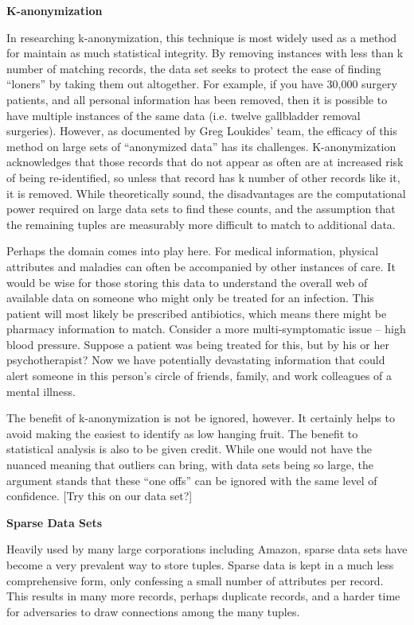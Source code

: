 \documentclass[10pt,journal,compsoc]{IEEEtran}
\begin{document}
\noindent \textbf{K-anonymization}

	In researching k-anonymization, this technique is most widely used as a method for maintain as much statistical integrity.  By removing instances with less than k number of matching records, the data set seeks to protect the ease of finding “loners” by taking them out altogether.  For example, if you have 30,000 surgery patients, and all personal information has been removed, then it is possible to have multiple instances of the same data (i.e. twelve gallbladder removal surgeries).  However, as documented by Greg Loukides’ team,  the efficacy of this method on large sets of “anonymized data”  has its challenges\cite{loukides}.  K-anonymization acknowledges that those records that do not appear as often are at increased risk of being re-identified, so unless that record has k number of other records like it, it is removed.  While theoretically sound, the disadvantages are the computational power required on large data sets to find these counts, and the assumption that the remaining tuples are measurably more difficult to match to additional data.  
	
	Perhaps the domain comes into play here.  For medical information, physical attributes and maladies can often be accompanied by other instances of care.  It would be wise for those storing this data to understand the overall web of available data on someone who might only be treated for an infection.  This patient will most likely be prescribed antibiotics, which means there might be pharmacy information to match.   Consider a more multi-symptomatic  issue – high blood pressure.  Suppose a patient was being treated for this, but by his or her psychotherapist?  Now we have potentially devastating information that could alert someone in this person’s circle of friends, family, and work colleagues of a mental illness.
	
	The benefit of k-anonymization is not be ignored, however.  It certainly helps to avoid making the easiest to identify as low hanging fruit.  The benefit to statistical analysis is also to be given credit.  While one would not have the nuanced meaning that outliers can bring, with data sets being so large, the argument stands that these “one offs” can be ignored with the same level of confidence.
[Try this on our data set?]
\linebreak

\noindent \textbf{Sparse Data Sets}

	Heavily used by many large corporations including Amazon, sparse data sets have become a very prevalent way to store tuples\cite{narayanan,gentry,rimes}.  Sparse data is kept in a much less comprehensive form, only confessing a small number of attributes per record.  This results in many more records, perhaps duplicate records, and a harder time for adversaries to draw connections among the many tuples.
	
\end{document}
